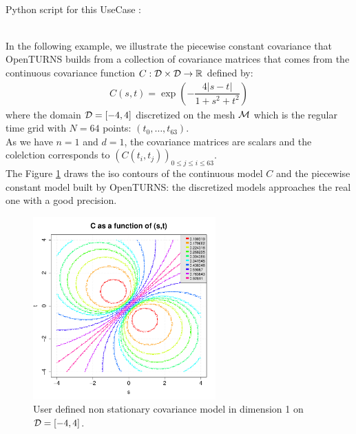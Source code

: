 \textspace\\
Python script for this UseCase :


\textspace\\


In the following example, we illustrate the piecewise constant covariance that OpenTURNS builds from a collection of covariance matrices that comes from the continuous covariance function $C : {\mathcal D} \times {\mathcal D} \rightarrow  {\mathbb R} $ defined by:
\begin{align}
  \displaystyle C(s,t) = \exp\left(-\dfrac{4|s-t|}{1+s^2+t^2}\right)
\end{align}
where  the domain ${\mathcal D}=[-4,4]$ discretized on the mesh ${\mathcal M}$ which is the regular time grid with $N=64$ points: $(t_0, \dots, t_{63})$.\\
As we have $n=1$ and $d=1$, the covariance matrices are scalars and the colelction corresponds to  $(C(t_i,t_j))_{0 \leq j \leq i \leq 63}$.\\

The Figure \ref{UserDefinedNonStationaryCovarianceModelDemonstration} draws the iso contours of the continuous model $C$ and the piecewise constant model built by OpenTURNS: the discretized models approaches the real one with a good precision.


\begin{figure}[H]
  \begin{center}
    \includegraphics[width=7cm]{Figures/NonStationCovFunc.pdf}
    \caption{User defined non stationary covariance model in dimension 1 on ${\mathcal D}=[-4,4]$.}
    \label{UserDefinedNonStationaryCovarianceModelDemonstration}
  \end{center}
\end{figure}
